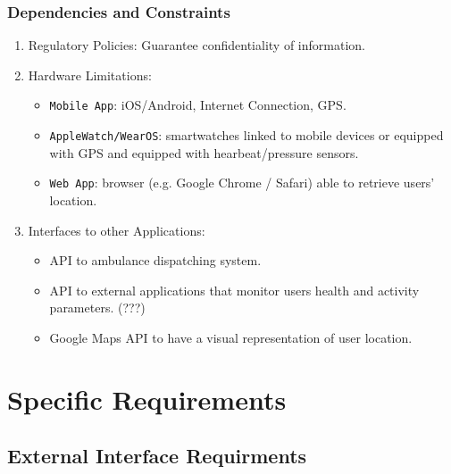 \documentclass[12pt,a4paper]{article}
\begin{document}
	\subsubsection{Dependencies and Constraints}
	\begin{enumerate}
		\item Regulatory Policies:
		Guarantee confidentiality of information.
		\item Hardware Limitations: 
		\begin{itemize}
			\item \texttt{Mobile App}: iOS/Android, Internet Connection, GPS.
			\item \texttt{AppleWatch/WearOS}: smartwatches linked to mobile devices or equipped with GPS and equipped with hearbeat/pressure sensors.
			\item \texttt{Web App}: browser (e.g. Google Chrome / Safari) able to retrieve users' location.
		\end{itemize}
		\item Interfaces to other Applications: 
		\begin{itemize}
			\item API to ambulance dispatching system.
			\item API to external applications that monitor users health and activity parameters. (???)
			\item Google Maps API to have a visual representation of user location.
		\end{itemize}
	\end{enumerate}
	
	\newpage
	\section{Specific Requirements}
	\subsection{External Interface Requirments}
\end{document}
